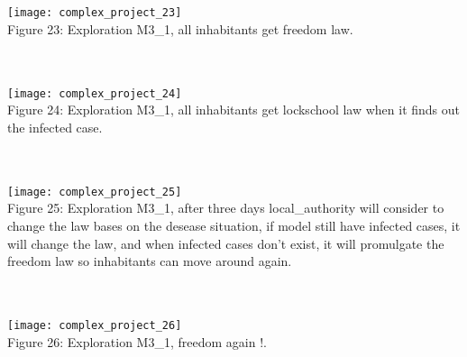\documentclass{article}
\begin{document}
\\\\
\texttt{[image: complex\_project\_23]}
\\
\caption{Figure 23: Exploration M3\_1, all inhabitants get freedom law.} 
\\\\
\texttt{[image: complex\_project\_24]}
\\
\caption{Figure 24: Exploration M3\_1, all inhabitants get lockschool law when it finds out the infected case.} 
\\\\
\texttt{[image: complex\_project\_25]}
\\
\caption{Figure 25: Exploration M3\_1, after three days local\_authority will consider to change the law bases on the desease situation, if model still have infected cases, it will change the law, and when infected cases don't exist, it will promulgate the freedom law so inhabitants can move around again.} 
\\\\
\texttt{[image: complex\_project\_26]}
\\
\caption{Figure 26: Exploration M3\_1, freedom again !.} 
\\
\end{document}
